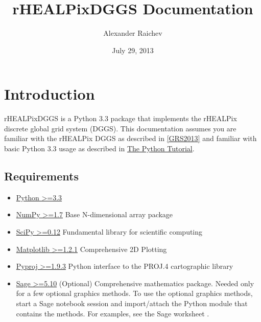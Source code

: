 \documentclass[a4paper,12ptopenany,oneside]{sphinxmanual}
\title{rHEALPixDGGS Documentation}
\date{July 29, 2013}
\author{Alexander Raichev}
\begin{document}
\maketitle
\tableofcontents
{}\label{index::doc}



\chapter{Introduction}
\label{introduction:introduction}\label{introduction:welcome-to-scenzgrid-dggs-s-documentation}\label{introduction::doc}
rHEALPixDGGS is a Python 3.3 package that implements the rHEALPix discrete global grid system (DGGS).
This documentation assumes you are familiar with the rHEALPix DGGS as described in {\hyperref[introduction:grs2013]{{[}GRS2013{]}}} and familiar with basic Python 3.3 usage as described in \href{http://docs.python.org/3/tutorial/}{The Python Tutorial}.


\section{Requirements}
\label{introduction:requirements}\begin{itemize}
\item {} 
\href{http://python.org/}{Python \textgreater{}=3.3}

\item {} 
\href{http://www.numpy.org/}{NumPy \textgreater{}=1.7} Base N-dimensional array package

\item {} 
\href{http://www.scipy.org/}{SciPy \textgreater{}=0.12} Fundamental library for scientific computing

\item {} 
\href{http://matplotlib.org/}{Matplotlib \textgreater{}=1.2.1} Comprehensive 2D Plotting

\item {} 
\href{http://code.google.com/p/pyproj/}{Pyproj \textgreater{}=1.9.3}
Python interface to the PROJ.4 cartographic library

\item {} 
\href{http://www.sagemath.org}{Sage \textgreater{}=5.10}
(Optional) Comprehensive mathematics package.
Needed only for a few optional graphics methods.
To use the optional graphics methods, start a Sage notebook session and import/attach the Python module that contains the methods.
For examples, see the Sage worksheet .

\end{itemize}
\end{document}
